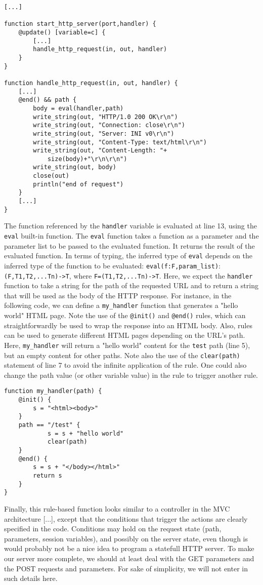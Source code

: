 \documentclass[11pt]{report}
\begin{document}
\begin{lstlisting}
[...]

function start_http_server(port,handler) {
	@update() [variable=c] {
		[...]
		handle_http_request(in, out, handler)
	}		
}

function handle_http_request(in, out, handler) {
	[...]
	@end() && path {
		body = eval(handler,path)
		write_string(out, "HTTP/1.0 200 OK\r\n")
		write_string(out, "Connection: close\r\n")
		write_string(out, "Server: INI v0\r\n")
		write_string(out, "Content-Type: text/html\r\n")
		write_string(out, "Content-Length: "+
			size(body)+"\r\n\r\n")
		write_string(out, body)
		close(out)
		println("end of request")		
	}
	[...]
}
\end{lstlisting}

The function referenced by the \texttt{handler} variable is evaluated at line 13, using the \texttt{eval} built-in function. The \texttt{eval} function takes a function as a parameter and the parameter list to be passed to the evaluated function. It returns the result of the evaluated function. In terms of typing, the inferred type of \texttt{eval} depends on the inferred type of the function to be evaluated: \texttt{eval(f:F,param\_list)}:\texttt{(F,T1,T2,...Tn)->T}, where \texttt{F=(T1,T2,...Tn)->T}. Here, we expect the \texttt{handler} function to take a string for the path of the requested URL and to return a string that will be used as the body of the HTTP response. For instance, in the following code, we can define a \texttt{my\_handler} function that generates a "hello world" HTML page. Note the use of the \texttt{@init()} and \texttt{@end()} rules, which can straightforwardly be used to wrap the response into an HTML body. Also, rules can be used to generate different HTML pages depending on the URL's path. Here, \texttt{my\_handler} will return a "hello world" content for the \texttt{test} path (line 5), but an empty content for other paths. Note also the use of the \texttt{clear(path)} statement of line 7 to avoid the infinite application of the rule. One could also change the path value (or other variable value) in the rule to trigger another rule.

\begin{lstlisting}
function my_handler(path) {
	@init() {
		s = "<html><body>"
	}
	path == "/test" {
			s = s + "hello world"
			clear(path)
	}
	@end() {
		s = s + "</body></html>"
		return s
	}
}
\end{lstlisting}

Finally, this rule-based function looks similar to a controller in the MVC architecture [...], except that the conditions that trigger the actions are clearly specified in the code. Conditions may hold on the request state (path, parameters, session variables), and possibly on the server state, even though is would probably not be a nice idea to program a statefull HTTP server. To make our server more complete, we should at least deal with the GET parameters and the POST requests and parameters. For sake of simplicity, we will not enter in such details here.
\end{document}
